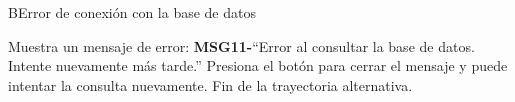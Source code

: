\begin{UCtrayectoriaA}{B}{Error de conexión con la base de datos}

	\UCpaso Muestra un mensaje de error: {\bf MSG11-}{``Error al consultar la base de datos. Intente nuevamente más tarde.''}
	\UCpaso[\UCactor] Presiona el botón  para cerrar el mensaje y puede intentar la consulta nuevamente.
	\UCpaso Fin de la trayectoria alternativa.
\end{UCtrayectoriaA}

